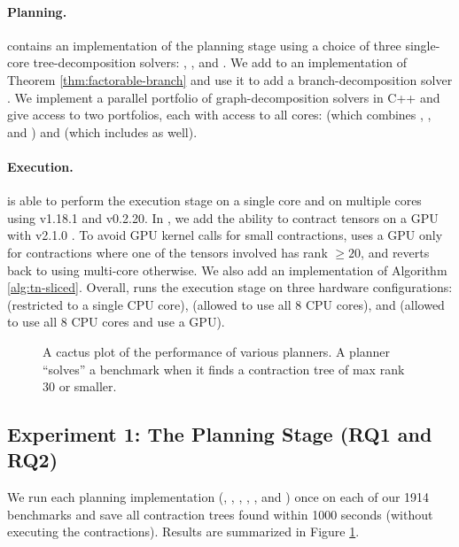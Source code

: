 \paragraph{Planning.} 
 contains an implementation of the planning stage using a choice of three single-core tree-decomposition solvers:  \cite{Tamaki17},  \cite{HS18}, and  \cite{AMW17}. We add to  an implementation of Theorem \ref{thm:factorable-branch} and use it to add a branch-decomposition solver  \cite{hicks02}.
We implement a parallel portfolio of graph-decomposition solvers in C++ and give  access to two portfolios, each with access to all cores:  (which combines ,  , and ) and  (which includes  as well).

\paragraph{Execution.} 
 is able to perform the execution stage on a single core and on multiple cores using  v1.18.1 and  v0.2.20. In , we add the ability to contract tensors on a GPU with  v2.1.0 \cite{ABCCDDDGII16}. To avoid GPU kernel calls for small contractions,  uses a GPU only for contractions where one of the tensors involved has rank $\geq 20$, and reverts back to using multi-core  otherwise. We also add an implementation of Algorithm \ref{alg:tn-sliced}.
Overall,  runs the execution stage on three hardware configurations:  (restricted to a single CPU core),  (allowed to use all 8 CPU cores), and  (allowed to use all 8 CPU cores and use a GPU).

\begin{figure}
	\centering
	
    \vspace*{-0.7cm}
	\caption{\label{fig:parallel:planning} A cactus plot of the performance of various planners. A planner ``solves'' a benchmark when it finds a contraction tree of max rank 30 or smaller.}
\end{figure}

\subsection{Experiment 1: The Planning Stage (RQ1 and RQ2)}
We run each planning implementation (, , , , , and ) once on each of our 1914 benchmarks and save all contraction trees found within 1000 seconds (without executing the contractions). Results are summarized in Figure \ref{fig:parallel:planning}. 

